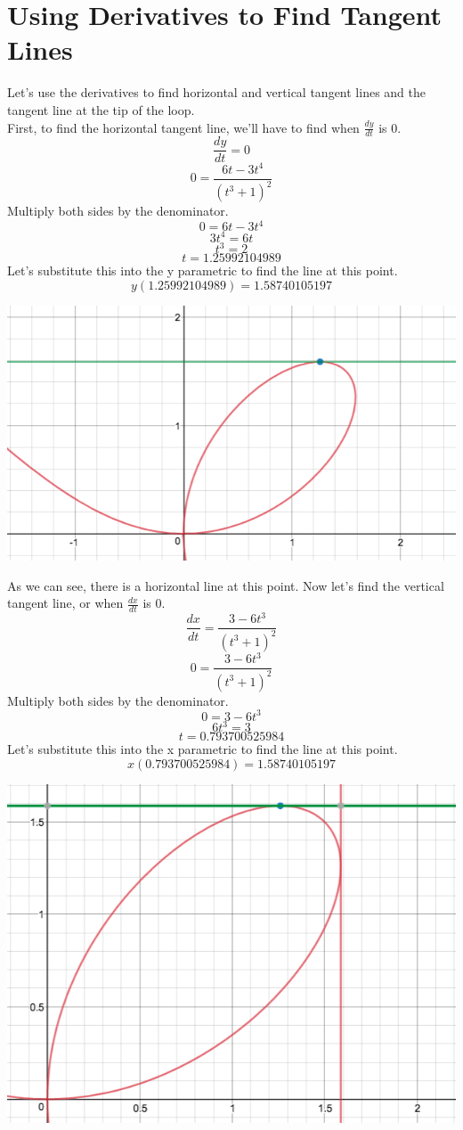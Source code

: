 \documentclass[a4paper,openright, 10pt]{article}
\begin{document}
\section*{Using Derivatives to Find Tangent Lines}
Let's use the derivatives to find horizontal and vertical tangent lines and the tangent line at the tip of the loop.\\
First, to find the horizontal tangent line, we'll have to find when $\frac{dy}{dt}$ is 0.
$$\frac{dy}{dt}=0$$
$$0=\frac{6t-3t^4}{(t^3+1)^2}$$
Multiply both sides by the denominator.
$$0=6t-3t^4$$
$$3t^4=6t$$
$$t^3=2$$
$$t=1.25992104989$$
Let's substitute this into the y parametric to find the line at this point. 
$$y(1.25992104989)=1.58740105197$$
\begin{center}
    \includegraphics[scale=0.5]{graph7}
\end{center}
As we can see, there is a horizontal line at this point.
Now let's find the vertical tangent line, or when $\frac{dx}{dt}$ is 0.
$$\frac{dx}{dt}=\frac{3-6t^3}{(t^3+1)^2}$$
$$0=\frac{3-6t^3}{(t^3+1)^2}$$
Multiply both sides by the denominator.
$$0=3-6t^3$$
$$6t^3=3$$
$$t=0.793700525984$$
Let's substitute this into the x parametric to find the line at this point.
$$x(0.793700525984)=1.58740105197$$
\begin{center}
    \includegraphics[scale=0.5]{graph8}
\end{center}
\end{document}

